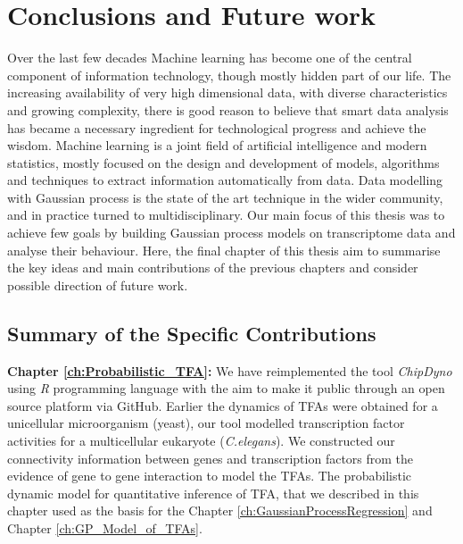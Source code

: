 
\chapter{Conclusions and Future work}

\ifpdf
    \graphicspath{{Chapter6/Figs/Raster/}{Chapter6/Figs/PDF/}{Chapter6/Figs/}}
\else
    \graphicspath{{Chapter6/Figs/Vector/}{Chapter6/Figs/}}
\fi

Over the last few decades Machine learning has become one of the central component of information technology, though mostly hidden part of our life. The increasing availability of very high dimensional data, with diverse characteristics and growing complexity, there is good reason to believe that smart data analysis has became a necessary ingredient for technological progress and achieve the wisdom. Machine learning is a joint field of artificial intelligence and modern statistics, mostly focused on the design and development of models, algorithms and techniques to extract information automatically from data. Data modelling with Gaussian process is the state of the art technique in the wider community, and in practice turned to multidisciplinary. Our main focus of this thesis was to achieve few goals by building Gaussian process models on transcriptome data and analyse their behaviour. Here, the final chapter of this thesis aim to summarise the key ideas and main contributions of the previous chapters and consider possible direction of future work.


\section{Summary of the Specific Contributions}
\textbf{Chapter \ref{ch:Probabilistic_TFA}:} We have reimplemented the tool \emph{ChipDyno} using \emph{R} programming language with the aim to make it public through an open source platform via GitHub. Earlier the dynamics of TFAs were obtained for a unicellular microorganism (yeast), our tool modelled transcription factor activities for a multicellular eukaryote (\textit{C.elegans}). We constructed our connectivity information between genes and transcription factors from the evidence of gene to gene interaction to model the TFAs. The probabilistic dynamic model for quantitative inference of TFA, that we described in this chapter used as the basis for the  Chapter \ref{ch:GaussianProcessRegression} and Chapter \ref{ch:GP_Model_of_TFAs}.

